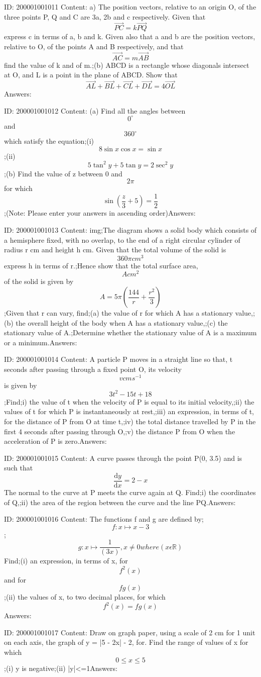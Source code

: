 \documentclass{article}
\begin{document}
ID: 200001001011
Content:
a) The position vectors, relative to an origin O, of the three points P, Q and C are 3a, 2b and c respectively. Given that \[\vec{PC}=k\vec{PQ}\] express c in terms of a, b and k. Given also that a and b are the position vectors, relative to O, of the points A and B respectively, and that \[\vec{AC}=m\vec{AB}\] find the value of k and of m.;(b) ABCD is a rectangle whose diagonals intersect at O, and L is a point in the plane of ABCD. Show that \[\vec{AL}+\vec{BL}+\vec{CL}+\vec{DL}=4\vec{OL}\]Answers:

ID: 200001001012
Content:
(a) Find all the angles between \[0^{\circ}\] and \[360^{\circ}\] which satisfy the equation;(i)	\[8 \sin x \cos x = \sin x\];(ii) \[5\tan^2y+5\tan y=2\sec^2y\];(b)	Find the value of z between 0 and \[2\pi\] for which \[\sin(\frac{z}{3}+5)=\frac{1}{2}\];(Note: Please enter your answers in ascending order)Answers:

ID: 200001001013
Content:
img;The diagram shows a solid body which consists of a hemisphere fixed, with no overlap, to the end of a right circular cylinder of radius r cm and height h cm. Given that the total volume of the solid is \[360\pi cm^3\] express h in terms of r.;Hence show that the total surface area, \[A cm^2\] of the solid is given by \[A=5\pi(\frac{144}{r}+\frac{r^{2}}{3})\] ;Given that r can vary, find;(a)	the value of r for which A has a stationary value,;(b)	the overall height of the body when A has a stationary value,;(c)	the stationary value of A.;Determine whether the stationary value of A is a maximum or a minimum.Answers:

ID: 200001001014
Content:
A particle P moves in a straight line so that, t seconds after passing through a fixed point O, its velocity \[vcms^{-1}\] is given by \[3t^2-15t+18\];Find;i) the value of t when the velocity of P is equal to its initial velocity,;ii) the values of t for which P is instantaneously at rest,;iii) an expression, in terms of t, for the distance of P from O at time t,;iv) the total distance travelled by P in the first 4 seconds after passing through O,;v) the distance P from O when the acceleration of P is zero.Answers:

ID: 200001001015
Content:
A curve passes through the point P(0, 3.5) and is such that \[\frac{\mathrm{d} y}{\mathrm{d} x}=2-x\] The normal to the curve at P meets the curve again at Q. Find;i) the coordinates of Q,;ii) the area of the region between the curve and the line PQ.Answers:

ID: 200001001016
Content:
The functions f and g are defined by; $$f:x \mapsto  x-3$$;$$g:x \mapsto \frac{1}{(3x)},x\neq 0  where (x\epsilon \mathbb{R})$$ Find;(i)	an expression, in terms of x, for \[f^2(x)\]  and for \[fg(x)\] ;(ii)	the values of x, to two decimal places, for which \[f^2(x)=fg(x)\]Answers:

ID: 200001001017
Content:
Draw on graph paper, using a scale of 2 cm for 1 unit on each axis, the graph of y = |5 - 2x| - 2, for. Find the range of values of x for which \[0\leq x\leq 5\] ;(i) y is negative;(ii) |y|<=1Answers:
\end{document}

